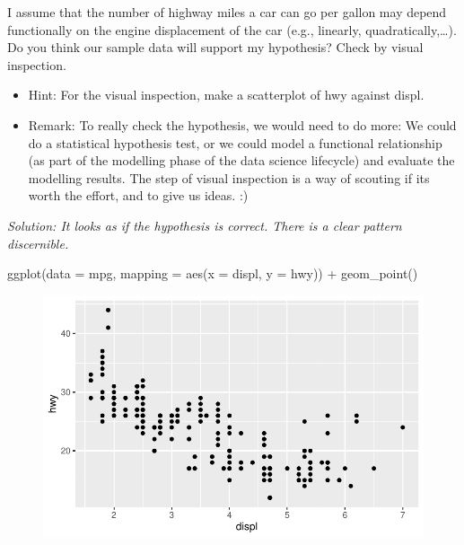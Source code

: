 \documentclass[
  letterpaper,
  DIV=11,
  numbers=noendperiod]{scrartcl}
\newenvironment{Shaded}{\begin{snugshade}}{\end{snugshade}}
\newcommand{\AttributeTok}[1]{\textcolor[rgb]{0.40,0.45,0.13}{#1}}
\newcommand{\FunctionTok}[1]{\textcolor[rgb]{0.28,0.35,0.67}{#1}}
\newcommand{\NormalTok}[1]{\textcolor[rgb]{0.00,0.23,0.31}{#1}}
\newcommand{\SpecialCharTok}[1]{\textcolor[rgb]{0.37,0.37,0.37}{#1}}
\begin{document}
I assume that the number of highway miles a car can go per gallon may
depend functionally on the engine displacement of the car (e.g.,
linearly, quadratically,\ldots). Do you think our sample data will
support my hypothesis? Check by visual inspection.

\begin{itemize}
\item
  Hint: For the visual inspection, make a scatterplot of hwy against
  displ.
\item
  Remark: To really check the hypothesis, we would need to do more: We
  could do a statistical hypothesis test, or we could model a functional
  relationship (as part of the modelling phase of the data science
  lifecycle) and evaluate the modelling results. The step of visual
  inspection is a way of scouting if its worth the effort, and to give
  us ideas. :)
\end{itemize}

\emph{Solution: It looks as if the hypothesis is correct. There is a
clear pattern discernible.}

\begin{Shaded}
\begin{Highlighting}[]
\FunctionTok{ggplot}\NormalTok{(}\AttributeTok{data =}\NormalTok{ mpg, }
       \AttributeTok{mapping =} \FunctionTok{aes}\NormalTok{(}\AttributeTok{x =}\NormalTok{ displ, }
                     \AttributeTok{y =}\NormalTok{ hwy)) }\SpecialCharTok{+}
  \FunctionTok{geom\_point}\NormalTok{()}
\end{Highlighting}
\end{Shaded}

\begin{figure}[H]

{\centering \includegraphics{Part1_Lecture1_Ex_files/figure-pdf/unnamed-chunk-28-1.pdf}

}

\end{figure}
\end{document}
